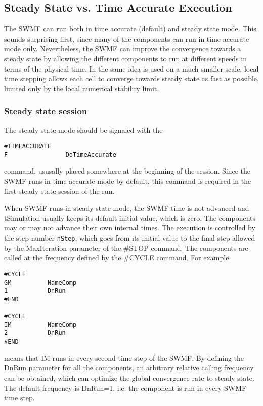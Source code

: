 \subsection{Steady State vs. Time Accurate Execution}

The SWMF can run both in time accurate (default) and
steady state mode. This sounds surprising first, 
since many of the components can run in time accurate 
mode only. Nevertheless, the SWMF can improve the convergence
towards a steady state by allowing the different components
to run at different speeds in terms of the physical time.
In \BATSRUS the same idea is used on a much smaller scale:
local time stepping allows each cell to converge towards
steady state as fast as possible, limited only by the local
numerical stability limit.

\subsubsection{Steady state session}

The steady state mode should be signaled with the 
\begin{verbatim}
#TIMEACCURATE
F                DoTimeAccurate
\end{verbatim}
command, ususally placed somewhere at the beginning of the session.
Since the SWMF runs in time accurate mode by default,
this command is required in the first steady state session of the run.

When SWMF runs in steady state mode, the SWMF time is not
advanced and tSimulation usually keeps its default initial value,
which is zero. 
The components may or may not advance their own
internal times. The execution is controlled by the 
step number {\tt nStep}, which goes from its initial value 
to the final step allowed by the MaxIteration parameter
of the \#STOP command. The components are called at
the frequency defined by the \#CYCLE command. For example
\begin{verbatim}
#CYCLE
GM          NameComp
1           DnRun
#END

#CYCLE
IM          NameComp
2           DnRun
#END
\end{verbatim}
means that IM runs in every second time step of the SWMF.
By defining the DnRun parameter for all the components,
an arbitrary relative calling frequency can be obtained,
which can optimize the global convergence rate to steady state.
The default frequency is DnRun=1, i.e. the component is
run in every SWMF time step. 

